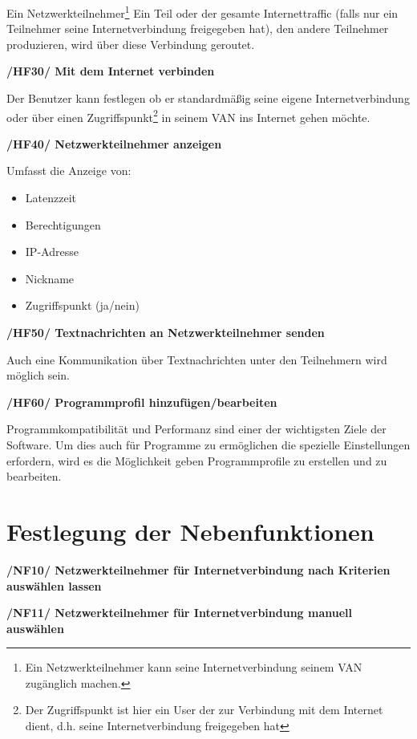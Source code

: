 \documentclass[a4paper,12pt]{scrreprt}
\begin{document}
		Ein Netzwerkteilnehmer\footnote{Ein Netzwerkteilnehmer kann seine Internetverbindung seinem VAN zugänglich machen.} Ein Teil oder der gesamte Internettraffic (falls nur ein Teilnehmer seine Internetverbindung freigegeben hat), den andere Teilnehmer produzieren, wird über diese Verbindung geroutet.
		
		\textbf {/HF30/ Mit dem Internet verbinden} 
		
		Der Benutzer kann festlegen ob er standardmäßig seine eigene Internetverbindung oder über einen Zugriffspunkt\footnote{Der Zugriffspunkt ist hier ein User der zur Verbindung mit dem Internet dient, d.h. seine Internetverbindung freigegeben hat} in seinem VAN ins Internet gehen möchte.
		
		\textbf { /HF40/ Netzwerkteilnehmer anzeigen
		}
				
		Umfasst die Anzeige von:
		\begin{itemize}
		
	
		\item Latenzzeit
		\item Berechtigungen
		\item IP-Adresse
		\item Nickname
		\item Zugriffspunkt (ja/nein)\\
			\end{itemize}
		
		
		
		
		
		\textbf {/HF50/ Textnachrichten an Netzwerkteilnehmer senden}
		
		
		Auch eine Kommunikation über Textnachrichten unter den Teilnehmern wird möglich sein.
		
		 \textbf {/HF60/ Programmprofil hinzufügen/bearbeiten}
		
		Programmkompatibilität und Performanz sind einer der wichtigsten Ziele der Software. Um dies auch für Programme zu ermöglichen die spezielle Einstellungen erfordern, wird es die Möglichkeit geben Programmprofile zu erstellen und zu bearbeiten.
		
	\section{Festlegung der Nebenfunktionen}
	\textbf {/NF10/ Netzwerkteilnehmer für Internetverbindung nach Kriterien auswählen lassen}
	
	
   	\textbf {/NF11/ Netzwerkteilnehmer für Internetverbindung manuell auswählen}
	
\end{document}
